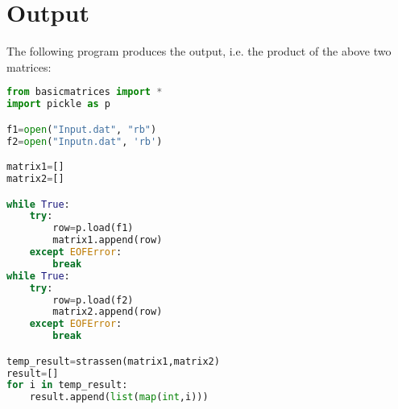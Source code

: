 \section{Output}
The following program produces the output, i.e. the product of the above two matrices:
\begin{lstlisting}[language=Python]
from basicmatrices import *
import pickle as p

f1=open("Input.dat", "rb")
f2=open("Inputn.dat", 'rb')

matrix1=[]
matrix2=[]

while True:
	try:
		row=p.load(f1)
		matrix1.append(row)
	except EOFError:
		break
while True:
	try:
		row=p.load(f2)
		matrix2.append(row)
	except EOFError:
		break

temp_result=strassen(matrix1,matrix2)
result=[]
for i in temp_result:
	result.append(list(map(int,i))) \end{lstlisting}
